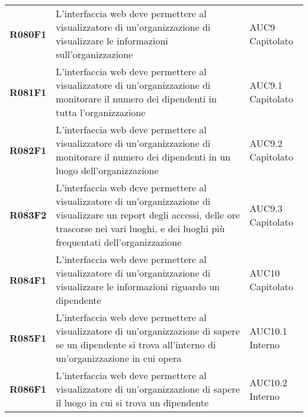 \documentclass[../analisi-dei-requisiti.tex]{subfiles}
\begin{document}
\begin{longtable}[H]{>{\centering\bfseries}m{3cm} >{\centering}m{10cm} >{\centering\arraybackslash}m{3cm}}
  R080F1                               & L'interfaccia web deve permettere al visualizzatore di un'organizzazione di visualizzare le informazioni sull'organizzazione                                                                            & AUC9 Capitolato               \\
  R081F1                               & L'interfaccia web deve permettere al visualizzatore di un'organizzazione di monitorare il numero dei dipendenti in tutta l'organizzazione                                                               & AUC9.1 Capitolato             \\
  R082F1                               & L'interfaccia web deve permettere al visualizzatore di un'organizzazione di monitorare il numero dei dipendenti in un luogo dell'organizzazione                                                         & AUC9.2 Capitolato             \\
  R083F2                               & L'interfaccia web deve permettere al visualizzatore di un'organizzazione di visualizzare un report degli accessi, delle ore trascorse nei vari luoghi, e dei luoghi più frequentati dell'organizzazione & AUC9.3 Capitolato             \\
  R084F1                               & L'interfaccia web deve permettere al visualizzatore di un'organizzazione di visualizzare le informazioni riguardo un dipendente                                                                         & AUC10 Capitolato              \\
  R085F1                               & L'interfaccia web deve permettere al visualizzatore di un'organizzazione di sapere se un dipendente si trova all'interno di un'organizzazione in cui opera                                              & AUC10.1 Interno               \\
  R086F1                               & L'interfaccia web deve permettere al visualizzatore di un'organizzazione di sapere il luogo in cui si trova un dipendente                                                                               & AUC10.2 Interno               \\


\end{longtable}
\end{document}
